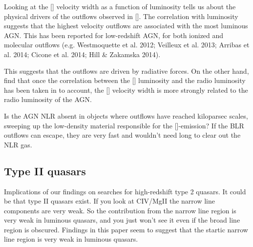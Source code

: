 Looking at the [] velocity width as a function of luminosity tells us about the physical drivers of the outflows observed in []. 
The correlation with luminosity suggests that the highest velocity outflows are associated with the most luminous \ac{AGN}. 
This has been reported for low-redshift \ac{AGN}, for both ionized and molecular outflows (e.g. Westmoquette et al. 2012; Veilleux et al. 2013; Arribas et al. 2014; Cicone et al. 2014; Hill \& Zakamska 2014).

This suggests that the outflows are driven by radiative forces. 
On the other hand, \citet{mullaney13} find that once the correlation between the [] luminosity and the radio luminosity has been taken in to account, the [] velocity width is more strongly related to the radio luminosity of the \ac{AGN}. 

Is the \ac{AGN} \ac{NLR} absent in objects where outflows have reached kiloparsec scales, sweeping up the low-density material responsible for the []-emission?
If the \ac{BLR} outflows can escape, they are very fast and wouldn't need long to clear out the \ac{NLR} gas. 


\subsection{Type II quasars}

Implications of our findings on searches for high-redshift type 2 quasars. It could be that type II quasars exist. If you look at CIV/MgII the narrow line components are very weak. So the contribution from the narrow line region is very weak in luminous quasars, and you just won't see it even if the broad line region is obscured.
Findings in this paper seem to suggest that the startic narrow line region is very weak in luminous quasars. 


